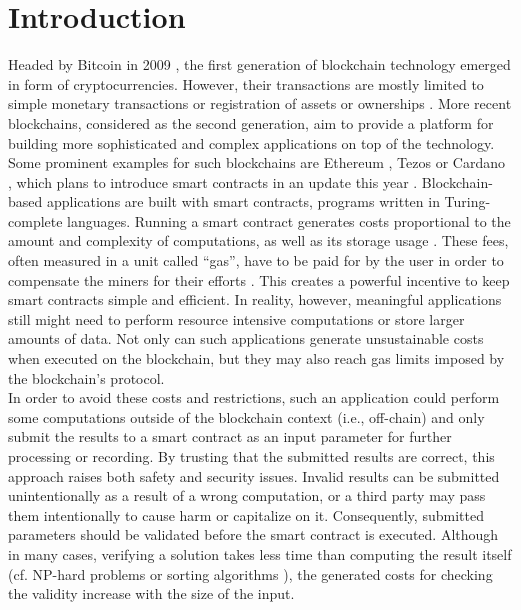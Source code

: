 \chapter{Introduction}\label{chap:introduction}
Headed by Bitcoin in 2009 \cite{bitcoin-whitepaper}, the first generation of blockchain technology emerged in form of cryptocurrencies. However, their transactions are mostly limited to simple monetary transactions or registration of assets or ownerships \cite{alharby_blockchain_2017}. More recent blockchains, considered as the second generation, aim to provide a platform for building more sophisticated and complex applications on top of the technology. Some prominent examples for such blockchains are Ethereum \cite{eth-whitepaper}, Tezos \cite{goodman_tezos_2014} or Cardano \cite{cardano_essay}, which plans to introduce smart contracts in an update this year \cite{cardano_alonzo}. Blockchain-based applications are built with smart contracts, programs written in Turing-complete languages. Running a smart contract generates costs proportional to the amount and complexity of computations, as well as its storage usage \cite{alharby_blockchain_2017}. These fees, often measured in a unit called ``gas'', have to be paid for by the user in order to compensate the miners for their efforts \cite{narayanan_bitcoin}. This creates a powerful incentive to keep smart contracts simple and efficient. In reality, however, meaningful applications still might need to perform resource intensive computations or store larger amounts of data. Not only can such applications generate unsustainable costs when executed on the blockchain, but they may also reach gas limits imposed by the blockchain's protocol. \\
In order to avoid these costs and restrictions, such an application could perform some computations outside of the blockchain context (i.e., off-chain) and only submit the results to a smart contract as an input parameter for further processing or recording. By trusting that the submitted results are correct, this approach raises both safety and security issues. Invalid results can be submitted unintentionally as a result of a wrong computation, or a third party may pass them intentionally to cause harm or capitalize on it. Consequently, submitted parameters should be validated before the smart contract is executed. Although in many cases, verifying a solution takes less time than computing the result itself (cf. NP-hard problems \cite{nph_problems} or sorting algorithms \cite{review_sorting}\cite{cpp_issorted}), the generated costs for checking the validity increase with the size of the input. \\
